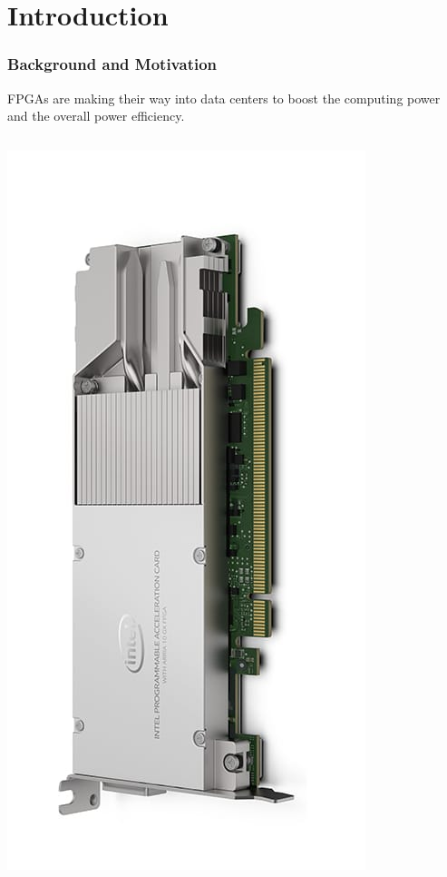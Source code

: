 \section{Introduction}
\begin{frame}
  \frametitle{Background and Motivation}

FPGAs are making their way into data centers to boost the computing power
	and the overall power efficiency.


\begin{columns}

\begin{column}{0.2\textwidth}
\includegraphics[scale=0.2]{./background/intel_fpga_nic.jpg}
\end{column}


\end{columns}
\end{frame}
